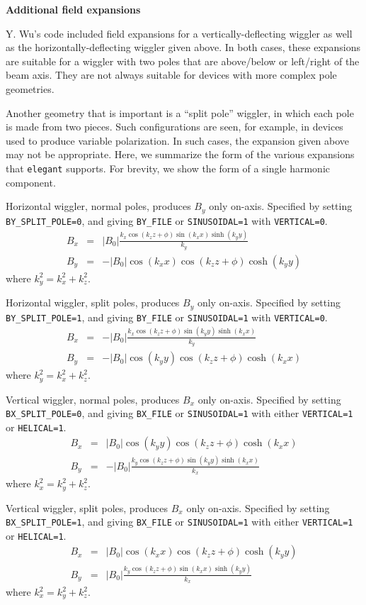 {\bf Additional field expansions}

Y. Wu's code included field expansions for a vertically-deflecting
wiggler as well as the horizontally-deflecting wiggler given above.
In both cases, these expansions are suitable for a wiggler with two
poles that are above/below or left/right of the beam axis.  They are
not always suitable for devices with more complex pole geometries.

Another geometry that is important is a ``split pole'' wiggler, in which
each pole is made from two pieces.  Such configurations are seen, for example,
in devices used to produce variable polarization.  In such cases, the
expansion given above may not be appropriate.  Here, we summarize the form of the
various expansions that {\tt elegant} supports.  For brevity, we show the
form of a single harmonic component.

Horizontal wiggler, normal poles, produces $B_y$ only on-axis.   Specified
by setting {\tt BY\_SPLIT\_POLE=0}, and giving {\tt BY\_FILE} or {\tt SINUSOIDAL=1} with {\tt VERTICAL=0}.
\begin{eqnarray}
B_x & = & \left|B_0\right| \frac{k_x \cos (k_z z + \phi) \sin (k_x x) \sinh (k_y y)}{k_y}\\
B_y & = & - \left|B_0\right| \cos (k_x x) \cos (k_z z + \phi) \cosh (k_y y)
\end{eqnarray}
where $k_y^2 = k_x^2 + k_z^2$.

Horizontal wiggler, split poles, produces $B_y$ only on-axis.   Specified
by setting {\tt BY\_SPLIT\_POLE=1}, and giving {\tt BY\_FILE} or {\tt SINUSOIDAL=1} with {\tt VERTICAL=0}.
\begin{eqnarray}
B_x & = & -\left|B_0\right| \frac{k_x \cos (k_z z + \phi) \sin (k_y y) \sinh (k_x x)}{k_y}\\
B_y & = & -\left|B_0\right| \cos (k_y y) \cos (k_z z + \phi) \cosh (k_x x)
\end{eqnarray}
where $k_y^2 = k_x^2 + k_z^2$.

Vertical wiggler, normal poles, produces $B_x$ only on-axis.   Specified
by setting {\tt BX\_SPLIT\_POLE=0}, and giving {\tt BX\_FILE} or {\tt SINUSOIDAL=1} with either {\tt VERTICAL=1} or
{\tt HELICAL=1}.
\begin{eqnarray}
B_x & = & \left|B_0\right| \cos (k_y y) \cos (k_z z + \phi) \cosh (k_x x)\\
B_y & = & -\left|B_0\right| \frac{k_y \cos (k_z z + \phi) \sin (k_y y) \sinh (k_x x)}{k_x}
\end{eqnarray}
where $k_x^2 = k_y^2 + k_z^2$.

Vertical wiggler, split poles, produces $B_x$ only on-axis.   Specified
by setting {\tt BX\_SPLIT\_POLE=1}, and giving {\tt BX\_FILE} or {\tt SINUSOIDAL=1} with either {\tt VERTICAL=1} or
{\tt HELICAL=1}.
\begin{eqnarray}
B_x & = & \left|B_0\right| \cos (k_x x) \cos (k_z z + \phi) \cosh (k_y y)\\
B_y & = & \left|B_0\right| \frac{k_y \cos (k_z z + \phi) \sin (k_x x) \sinh (k_y y)}{k_x}
\end{eqnarray}
where $k_x^2 = k_y^2 + k_z^2$.
